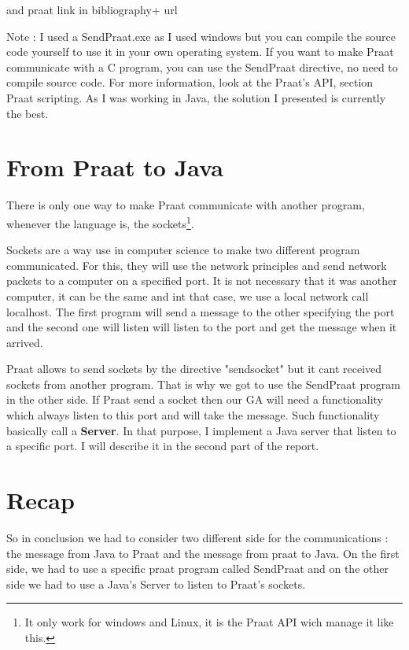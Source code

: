 \documentclass[12pt]{report}
\begin{document}
 and praat link in bibliography+ url

Note : I used a SendPraat.exe as I used windows but you can compile the source code yourself to use it in your own operating system. If you want to make Praat communicate with a C program, you can use the SendPraat directive, no need to compile source code. For more information, look at the Praat's API, section Praat scripting. As I was working in Java, the solution I presented is currently the best.

\section{From Praat to Java}
There is only one way to make Praat communicate with another program, whenever the language is, the sockets\footnote{It only work for windows and Linux, it is the Praat API wich manage it like this.}. 

Sockets are a way use in computer science to make two different program communicated. For this, they will use the network principles and send network packets to a computer on a specified port. It is not necessary that it was another computer, it can be the same and int that case, we use a local network call localhost. The first program will send a message to the other specifying the port and the second one will listen will listen to the port and get the message when it arrived.

Praat allows to send sockets by the directive "sendsocket" but it cant received sockets from another program. That is why we got to use the SendPraat program in the other side.
If Praat send a socket then our GA will need a functionality which always listen to this port and  will take the message. Such functionality basically call a {\bfseries Server}.
In that purpose, I implement a Java server that listen to a specific port. I will describe it in the second part of the report.

\section{Recap}
So in conclusion we had to consider two different side for the communications : the message from Java to Praat and the message from praat to Java. On the first side, we had to use a specific praat program called SendPraat and on the other side we had to use a Java's Server to listen to Praat's sockets.
\end{document}

